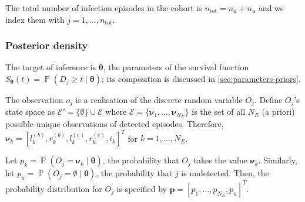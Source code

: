 \documentclass[12pt]{article}
\DeclareMathOperator{\prob}{\mathbb{P}}
\newcommand\set{\mathcal}
\renewcommand{\vec}[1]{\bm{#1}}
\newcommand{\ntot}{n_\text{tot}}
\newcommand{\ndet}{n_\text{d}}
\newcommand{\nnodet}{n_\text{u}}
\begin{document}
The total number of infection episodes in the cohort is $\ntot = \ndet + \nnodet$ and we index them with $j = 1, \dots, \ntot$.

\subsubsection{Posterior density}

The target of inference is $\vec{\theta}$, the parameters of the survival function $S_{\vec{\theta}}(t) = \prob(D_j \geq t \mid \vec\theta)$; its composition is discussed in \cref{sec:parameters-priors}.

The observation $o_j$ is a realisation of the discrete random variable $O_j$.
Define $O_j$'s state space as $\set{E}' = \{ \emptyset \} \cup \set{E}$ where $\set{E} = \{ \vec{\nu}_1, \dots, \vec{\nu}_{N_E} \}$ is the set of all $N_E$ (a priori) possible unique observations of detected episodes.
Therefore, $\vec{\nu}_k = [l^{(b)}_k, r^{(b)}_k, l^{(e)}_k, r^{(e)}_k, i_k]^T$ for $k = 1, \dots, N_E$.

Let $p_k = \prob(O_j = \vec{\nu}_k \mid \vec{\theta})$, the probability that $O_j$ takes the value $\vec{\nu}_k$.
Similarly, let $p_u = \prob(O_j = \emptyset \mid \vec{\theta})$, the probability that $j$ is undetected.
Then, the probability distribution for $O_j$ is specified by $\vec{p} = [p_1, \dots, p_{N_E}, p_u]^T$.
\end{document}
